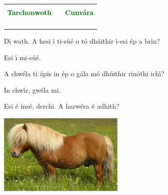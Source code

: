 \begin{table}[H]
\centering
    \begin{tabular}{cM{10.0cm}c}
     &  & \\
    \textcolor{darkgreen}{\textbf{Tarchonwoth}} &  & \textcolor{darkgreen}{\textbf{Cunv\'{a}ra}}\\
     &  & \\
     &  & \\
     &  & \\
     &  & 
    \end{tabular}
\end{table}

\begin{leftbubbles}D\'{\i} wath. A hesi \'{\i} ti-s\'{u}\'{e} o t\'{o} dh\'{u}ithir \'{\i}-esi \'{e}p a brin?\end{leftbubbles}
\begin{rightbubbles}
Esi \'{\i} mi-s\'{u}\'{e}.

A chw\'{e}la ti \'{a}pis in \'{e}p o g\'{a}la m\'{o} dh\'{u}ithir rin\'{o}thi ich\'{\i}?
\end{rightbubbles}
\begin{leftbubbles}In chw\'{\i}r, gw\'{e}la mi.\end{leftbubbles}
\begin{rightbubbles}Esi \'{e} ins\'{e}, derchi. A harw\'{e}ra \'{e} adhith?\end{rightbubbles}
\begin{center}\includegraphics[height=4.0cm]{img/menghavan12_5}\end{center}

